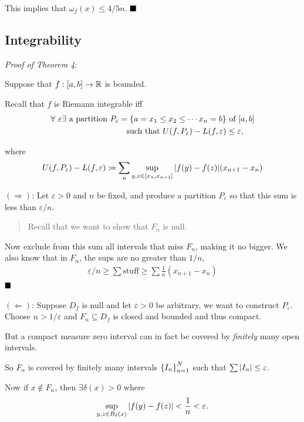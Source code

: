 This implies that \(\omega_f(x) \leq 4/5n\). \(\qed\)

\hypertarget{integrability}{%
\subsection{Integrability}\label{integrability}}

\emph{Proof of Theorem 4}:

Suppose that \(f: [a,b] \to {\mathbb{R}}\) is bounded.

Recall that \(f\) is Riemann integrable iff \begin{align*}
\forall ~\varepsilon \exists \text{ a partition } P_\varepsilon 
= \left\{{a=x_1 \leq x_2 \leq \cdots x_n = b}\right\} &\text{ of } [a,b] \\
\text{ such that }U(f, P_\varepsilon) - L(f, \varepsilon) &\leq \varepsilon
,\end{align*}

where
\begin{align*}
U(f, P_\varepsilon) - L(f, \varepsilon) \coloneqq
\sum_n \sup_{y, z \in [x_n, x_{n+1}]} {\left\lvert {f(y) - f(z)} \right\rvert} (x_{n+1} - x_{n})
\end{align*}

\((\Rightarrow)\): Let \(\varepsilon > 0\) and \(n\) be fixed, and
produce a partition \(P_\varepsilon\) so that this sum is less than
\(\varepsilon / n\).

\begin{quote}
Recall that we want to show that \(F_n\) is null.
\end{quote}

Now exclude from this sum all intervals that miss \(F_n\), making it no
bigger. We also know that in \(F_n\), the sups are no greater than
\(1/n\),
\begin{align*}
\varepsilon/n \geq \sum \text{stuff} \geq \sum \frac 1 n (x_{n+1} - x_n)
\end{align*} \(\qed\)

\((\Leftarrow)\): Suppose \(D_f\) is null and let \(\varepsilon>0\) be
arbitrary, we want to construct \(P_\varepsilon\). Choose
\(n > 1/\varepsilon\) and \(F_n \subseteq D_f\) is closed and bounded
and thus compact.

But a compact measure zero interval can in fact be covered by
\emph{finitely} many open intervals.

So \(F_n\) is covered by finitely many intervals
\(\left\{{ I_n }\right\}_{n=1}^N\) such that
\(\sum {\left\lvert {I_n} \right\rvert} \leq \varepsilon\).

Now if \(x\not\in F_n\), then \(\exists \delta(x) > 0\) where
\begin{align*}
\sup_{y,z \in B_\delta(x)} {\left\lvert {f(y) - f(z)} \right\rvert} < \frac 1 n < \varepsilon.
\end{align*}

